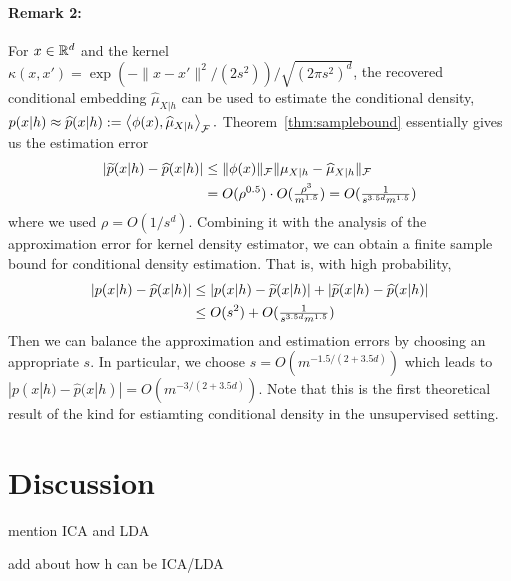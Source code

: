 \documentclass{article}
\newcommand{\Le}[1]{{\color{red}{\bf\sf [note: #1]}}}
\begin{document}
\paragraph{Remark 2:} \Le{say something about general f case.} For $x\in \mathbb{R}^d$ and the kernel $\kappa(x,x') = \exp(-\|x-x'\|^2/(2 s^2)) / \sqrt{(2\pi s^2)^d}$, the recovered conditional embedding $\widehat \mu_{X|h}$ can be used to estimate the conditional density, $p(x|h) \approx \widehat p(x|h) := \left\langle \phi(x),\widehat \mu_{X|h} \right\rangle_{\mathcal{F}}.$
Theorem~\ref{thm:samplebound} essentially gives us the estimation error
\begin{align*}
  |\widetilde p(x|h) - \widehat p(x|h)|
  &\leq \|\phi(x)\|_{\mathcal{F}} \|\mu_{X|h} - \widehat \mu_{X|h}\|_{\mathcal{F}} \\
  &=O(\rho^{0.5})\cdot O({\textstyle \frac{\rho^3}{m^{1.5}}}) = O({\textstyle \frac{1}{s^{3.5d}m^{1.5}}})
\end{align*}
where we used $\rho = O(1/s^d)$.
Combining it with the analysis of the approximation error for kernel density estimator, we can obtain a finite sample bound for conditional density estimation. That is, with high probability,
\begin{align*}
  |p(x|h) - \widehat p(x|h)|
  &\leq |p(x|h) - \widetilde p(x|h)| + |\widetilde p(x|h) - \widehat p(x|h)| \\
  &\leq O(s^2) + O({\textstyle \frac{1}{s^{3.5d}m^{1.5}}})
\end{align*}
Then we can balance the approximation and estimation errors by choosing an appropriate $s$.
In particular, we choose $s = O(m^{-1.5/(2+3.5d)})$ which leads to $|p(x|h) - \widehat p(x|h)| = O(m^{-3/(2+3.5d)})$.
Note that this is the first theoretical result of the kind for estiamting conditional density in the unsupervised setting.

\vspace{-3mm}
\section{Discussion}
\vspace{-3mm}

mention ICA and LDA

add about how h can be ICA/LDA
\end{document}
